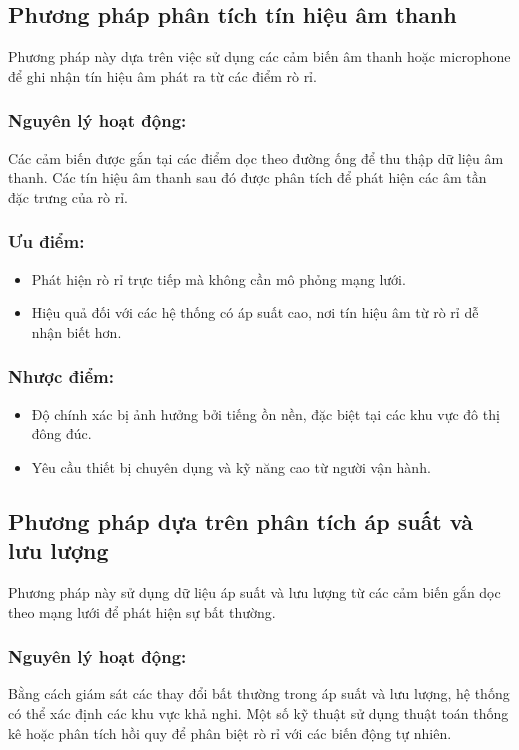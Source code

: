 \subsection{Phương pháp phân tích tín hiệu âm thanh}
Phương pháp này\cite{BANJARA2020104243} dựa trên việc sử dụng các cảm biến âm thanh hoặc microphone để ghi nhận tín hiệu âm phát ra từ các điểm rò rỉ.

\subsubsection{Nguyên lý hoạt động:}
Các cảm biến được gắn tại các điểm dọc theo đường ống để thu thập dữ liệu âm thanh. Các tín hiệu âm thanh sau đó được phân tích để phát hiện các âm tần đặc trưng của rò rỉ.

\subsubsection{Ưu điểm:}
\begin{itemize}
    \item Phát hiện rò rỉ trực tiếp mà không cần mô phỏng mạng lưới.
    \item Hiệu quả đối với các hệ thống có áp suất cao, nơi tín hiệu âm từ rò rỉ dễ nhận biết hơn.
\end{itemize}

\subsubsection{Nhược điểm:}
\begin{itemize}
    \item Độ chính xác bị ảnh hưởng bởi tiếng ồn nền, đặc biệt tại các khu vực đô thị đông đúc.
    \item Yêu cầu thiết bị chuyên dụng và kỹ năng cao từ người vận hành.
\end{itemize}

\subsection{Phương pháp dựa trên phân tích áp suất và lưu lượng}
Phương pháp này sử dụng dữ liệu áp suất và lưu lượng từ các cảm biến gắn dọc theo mạng lưới để phát hiện sự bất thường.

\subsubsection{Nguyên lý hoạt động:}
Bằng cách giám sát các thay đổi bất thường trong áp suất và lưu lượng, hệ thống có thể xác định các khu vực khả nghi. Một số kỹ thuật sử dụng thuật toán thống kê hoặc phân tích hồi quy để phân biệt rò rỉ với các biến động tự nhiên.

